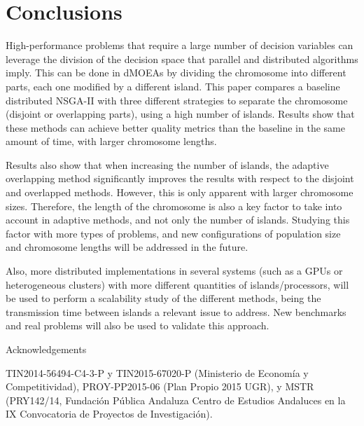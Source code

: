 \documentclass[Afour,sageh,times]{sagej}
\begin{document}
\section{Conclusions}

High-performance problems that require a large number of decision variables can leverage the division of the decision space that parallel and distributed algorithms imply. This can be done in dMOEAs by dividing the chromosome into different parts, each one modified by a different island. This paper compares a baseline distributed NSGA-II with three different strategies to separate the chromosome (disjoint or overlapping parts), using a high number of islands. Results show that these methods can achieve better quality metrics than the baseline in the same amount of time, with larger chromosome lengths.

Results also show that when increasing the number of islands, the adaptive overlapping method significantly improves the results with respect to the disjoint and overlapped methods. However, this is only apparent with larger chromosome sizes. Therefore, the length of the chromosome is also a key factor to take into account in adaptive methods, and not only the number of islands. Studying this factor with more types of problems, and new configurations of population size and chromosome lengths will be addressed in the future.%
%

Also, more distributed implementations in several systems (such as a GPUs or heterogeneous clusters) with more different quantities of islands/processors, will be used to perform a scalability study of the different methods, being the transmission time between islands a relevant issue to address. New benchmarks and real problems will also be  used to validate this approach. 



\begin{acks}
Acknowledgements
\end{acks}

TIN2014-56494-C4-3-P y TIN2015-67020-P (Ministerio de Economía y Competitividad), PROY-PP2015-06 (Plan Propio 2015 UGR),  y MSTR (PRY142/14, Fundaci\'on P\'ublica Andaluza Centro de Estudios Andaluces en la IX Convocatoria de Proyectos de Investigaci\'on).







\end{document}
